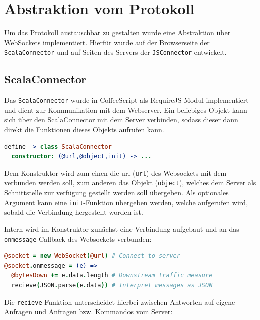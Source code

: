 \section{Abstraktion vom Protokoll}
\label{sec:jsc}

Um das Protokoll austauschbar zu gestalten wurde eine Abstraktion über WebSockets implementiert.
Hierfür wurde auf der Browserseite der \texttt{ScalaConnector} und auf Seiten des Servers der
\texttt{JSConnector} entwickelt.

\subsection{ScalaConnector}

Das \texttt{ScalaConnector} wurde in CoffeeScript als RequireJS-Modul implementiert und dient zur
Kommunikation mit dem Webserver. Ein beliebiges Objekt kann sich über den ScalaConnector mit dem
Server verbinden, sodass dieser dann direkt die Funktionen dieses Objekts aufrufen kann.

\begin{lstlisting}[language=coffee]
define -> class ScalaConnector
  constructor: (@url,@object,init) -> ...
\end{lstlisting}

Dem Konstruktor wird zum einen die url (\texttt{url}) des Websockets mit dem verbunden werden soll,
zum anderen das Objekt (\texttt{object}), welches dem Server als Schnittstelle zur verfügung
gestellt werden soll übergeben. Als optionales Argument kann eine \texttt{init}-Funktion übergeben
werden, welche aufgerufen wird, sobald die Verbindung hergestellt worden ist.

Intern wird im Konstruktor zunächst eine Verbindung aufgebaut und an das
\texttt{onmessage}-Callback des Websockets verbunden:

\begin{lstlisting}[language=coffee]
@socket = new WebSocket(@url) # Connect to server
@socket.onmessage = (e) =>    
  @bytesDown += e.data.length # Downstream traffic measure
  recieve(JSON.parse(e.data)) # Interpret messages as JSON
\end{lstlisting}

Die \texttt{recieve}-Funktion unterscheidet hierbei zwischen Antworten auf eigene Anfragen und
Anfragen bzw. Kommandos vom Server:

